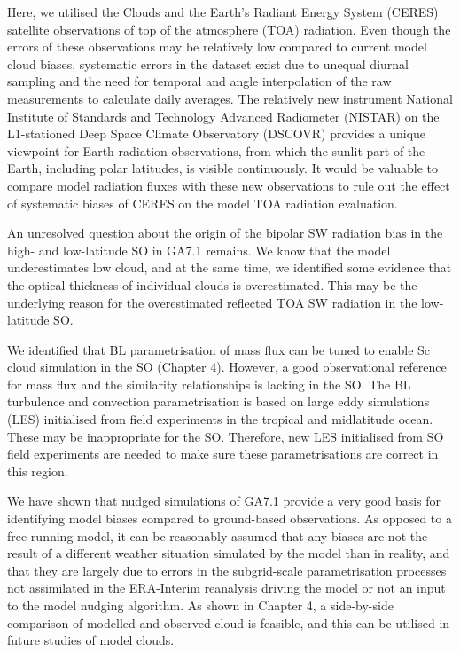 Here, we utilised the Clouds and the Earth's Radiant Energy System (CERES) satellite observations of top of the atmosphere (TOA) radiation. Even
though the errors of these observations may be relatively low compared to 
current model cloud biases, systematic errors in the dataset exist due
to unequal diurnal sampling and the need for temporal and angle
interpolation of the raw measurements to calculate daily averages. 
The relatively new instrument National Institute of Standards and Technology
Advanced Radiometer (NISTAR) on the L1-stationed Deep Space Climate Observatory (DSCOVR)
provides a unique viewpoint for Earth radiation observations, from which 
the sunlit part of the Earth, including polar latitudes, is visible continuously.
It would be valuable to compare model radiation fluxes with these new
observations to rule out the effect of systematic biases of CERES on the
model TOA radiation evaluation.

An unresolved question about the origin of the bipolar SW radiation
bias in the high- and low-latitude SO in GA7.1 remains. We know that
the model underestimates low cloud, and at the same time, we identified
some evidence that the optical thickness of individual clouds is overestimated.
This may be the underlying reason for the overestimated reflected TOA SW
radiation in the low-latitude SO.

We identified that BL parametrisation of mass flux can be tuned
to enable Sc cloud simulation in the SO (Chapter 4). However,
a good observational reference for mass flux and the similarity relationships
is lacking in the SO. The BL turbulence and convection
parametrisation is based on large eddy simulations (LES) initialised
from field experiments in the tropical and midlatitude ocean. These may be
inappropriate for the SO. Therefore, new LES initialised from SO field
experiments are needed to make sure these parametrisations are correct in this
region.

We have shown that nudged simulations of GA7.1 provide a very good basis
for identifying model biases compared to ground-based observations. As opposed
to a free-running model, it can be reasonably assumed that any biases are
not the result of a different weather situation simulated by the model
than in reality, and that they are largely due to errors in the subgrid-scale
parametrisation processes not assimilated in the ERA-Interim reanalysis driving
the model or not an input to the model nudging algorithm. As shown in Chapter 4,
a side-by-side comparison of modelled and observed cloud is feasible, and this
can be utilised in future studies of model clouds.


